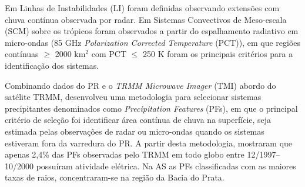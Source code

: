 


Em  Linhas de Instabilidades (LI) foram definidas observando extensões com chuva contínua observada por radar. Em  Sistemas Convectivos de Meso-escala (SCM) sobre os trópicos foram observados a partir do espalhamento radiativo em micro-ondas (85 GHz  \textit{Polarization Corrected Temperature} (PCT)), em que regiões contínuas $\geqslant$ 2000 km$^2$ com PCT $\leqslant$ 250 K foram os principais critérios para a identificação dos sistemas.


Combinando dados do PR e o \textit{TRMM Microwave Imager} (TMI) abordo do satélite TRMM,  desenvolveu uma metodologia para selecionar sistemas precipitantes denominados como \textit{Precipitation Features} (PFs), em que o principal critério de seleção foi identificar área contínua de chuva na superfície, seja estimada pelas observações de radar ou micro-ondas quando os sistemas estiveram fora da varredura do PR. A partir desta metodologia,  mostraram que apenas 2,4\% das PFs observadas pelo TRMM em todo globo entre 12/1997--10/2000 possuíram atividade elétrica. Na AS as PFs classificadas com as maiores taxas de raios, concentraram-se na região da Bacia do Prata.%


